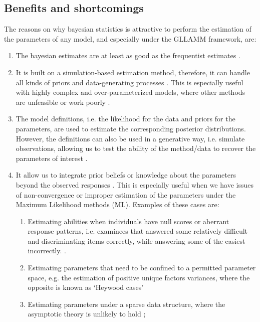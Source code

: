 \subsection{Benefits and shortcomings}

The reasons on why bayesian statistics is attractive to perform the estimation of the parameters of any model, and especially under the GLLAMM framework, are:

\begin{enumerate}
	\item The bayesian estimates are at least as good as the frequentist estimates \cite{Baker_1998, Wollack_2002, Hsieh_2010}. 
	
	\item It is built on a simulation-based estimation method, therefore, it can handle all kinds of priors and data-generating processes \cite{Fox_2010}. This is especially useful with highly complex and over-parameterized models, where other methods are unfeasible or work poorly \cite{Baker_1998, Kim_1999}. 
	
	\item The model definitions, i.e. the likelihood for the data and priors for the parameters, are used to estimate the corresponding posterior distributions. However, the definitions can also be used in a generative way, i.e. simulate observations, allowing us to test the ability of the method/data to recover the parameters of interest \cite{McElreath_2020}.
	
	\item It allow us to integrate prior beliefs or knowledge about the parameters beyond the observed responses \cite{Fox_2010, Skrondal_et_al_2004a}. This is especially useful when we have issues of non-convergence or improper estimation of the parameters under the Maximum Likelihood methods (ML). Examples of these cases are:
	
	\begin{enumerate}
		\item Estimating abilities when individuals have null scores or aberrant response patterns, i.e. examinees that answered some relatively difficult and discriminating items correctly, while answering some of the easiest incorrectly. \cite{Hambleton_et_al_1991a, Azevedo_2003}.
		
		\item Estimating parameters that need to be confined to a permitted parameter space, e.g. the estimation of positive unique factors variances, where the opposite is known as ‘Heywood cases’ \cite{Martin_et_al_1975}
		
		\item Estimating parameters under a sparse data structure, where the asymptotic theory is unlikely to hold \cite{Fox_2010};
		
	\end{enumerate}
	
\end{enumerate}

